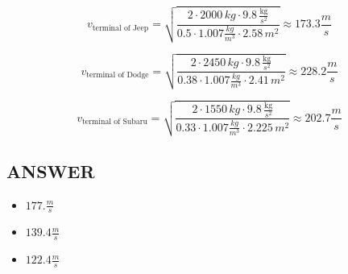 $$ v_{\text{terminal of Jeep}} = \sqrt{\frac{2 \cdot 2000 \, kg \cdot 9.8 \, \frac{\text{kg}}{s^2}}{0.5 \cdot 1.007 \frac{kg}{m^3} \cdot 2.58 \, m^2}} \approx \boxed{173.3 \frac{m}{s}}$$

$$ v_{\text{terminal of Dodge}} = \sqrt{\frac{2 \cdot 2450 \, kg \cdot 9.8 \, \frac{\text{kg}}{s^2}}{0.38 \cdot 1.007 \frac{kg}{m^3} \cdot 2.41 \, m^2}}  \approx \boxed{228.2 \frac{m}{s}}$$ 

$$ v_{\text{terminal of Subaru}} = \sqrt{\frac{2 \cdot 1550 \, kg \cdot 9.8 \, \frac{\text{kg}}{s^2}}{0.33 \cdot 1.007 \frac{kg}{m^3} \cdot 2.225 \, m^2}} \approx \boxed{202.7 \frac{m}{s}}$$ 


\vfill \subsection*{ANSWER}
\begin{itemize}
    \item $177. \frac{m}{s}$
    \item $139.4 \frac{m}{s}$
    \item $122.4 \frac{m}{s}$
\end{itemize}

